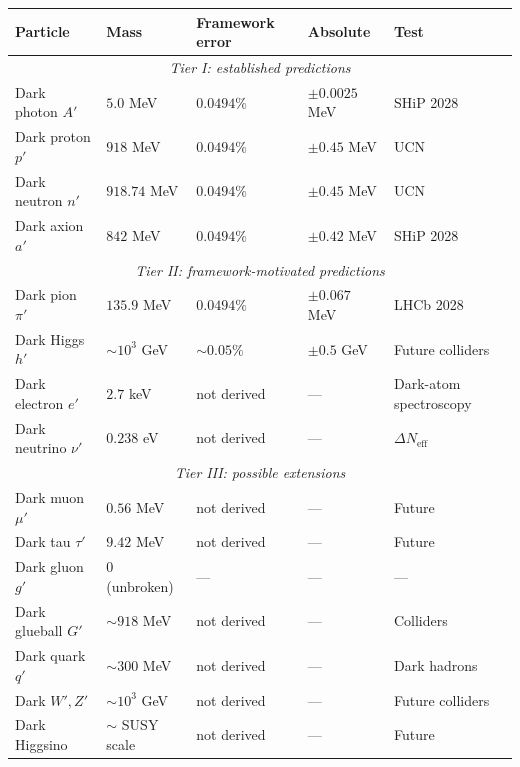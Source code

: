 \documentclass[a4paper,7pt,oneside,openany]{book}
\begin{document}
\begin{table}[htbp]
\centering
\small
\renewcommand{\arraystretch}{1.3}
\begin{tabular}{@{}p{}p{}p{}p{}p{}@{}}
\toprule
Particle & Mass & Framework error & Absolute & Test \\
\midrule
\multicolumn{5}{c}{\textit{Tier I: established predictions}} \\
\midrule
Dark photon $A'$   & $5.0$ MeV        & $0.0494\%$ & $\pm 0.0025$ MeV & SHiP 2028 \\
Dark proton $p'$   & $918$ MeV        & $0.0494\%$ & $\pm 0.45$ MeV   & UCN \\
Dark neutron $n'$  & $918.74$ MeV     & $0.0494\%$ & $\pm 0.45$ MeV   & UCN \\
Dark axion $a'$    & $842$ MeV        & $0.0494\%$ & $\pm 0.42$ MeV   & SHiP 2028 \\
\midrule
\multicolumn{5}{c}{\textit{Tier II: framework-motivated predictions}} \\
\midrule
Dark pion $\pi'$   & $135.9$ MeV      & $0.0494\%$ & $\pm 0.067$ MeV  & LHCb 2028 \\
Dark Higgs $h'$    & $\sim 10^{3}$ GeV& $\sim 0.05\%$ & $\pm 0.5$ GeV & Future colliders \\
Dark electron $e'$ & $2.7$ keV        & not derived & ---           & Dark-atom spectroscopy \\
Dark neutrino $\nu'$ & $0.238$ eV     & not derived & ---           & $\Delta N_{\text{eff}}$ \\
\midrule
\multicolumn{5}{c}{\textit{Tier III: possible extensions}} \\
\midrule
Dark muon $\mu'$   & $0.56$ MeV       & not derived & ---           & Future \\
Dark tau $\tau'$   & $9.42$ MeV       & not derived & ---           & Future \\
Dark gluon $g'$    & $0$ (unbroken)   & ---         & ---           & --- \\
Dark glueball $G'$ & $\sim 918$ MeV   & not derived & ---           & Colliders \\
Dark quark $q'$    & $\sim 300$ MeV   & not derived & ---           & Dark hadrons \\
Dark $W', Z'$      & $\sim 10^{3}$ GeV& not derived & ---           & Future colliders \\
Dark Higgsino      & $\sim$ SUSY scale& not derived & ---           & Future \\

\end{tabular}
\end{table}
\end{document}

